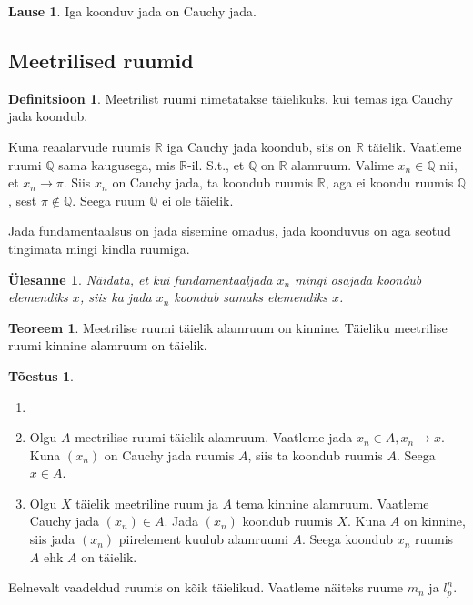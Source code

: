 \documentclass{article}[12pt]
\newcommand{\R}{\mathbb{R}}
\newcommand{\Q}{\mathbb{Q}}
\newtheorem{yl}{Ülesanne}[section]
\theoremstyle{definition}
\newtheorem{definition}{Definitsioon}[section]
\theoremstyle{definition}
\newtheorem{theorem}{Teoreem}[section]
\theoremstyle{definition}
\newtheorem{lause}{Lause}[section]
\theoremstyle{break}
\newtheorem*{toestus}{Tõestus}
\begin{document}
\begin{lause}
	Iga koonduv jada on Cauchy jada.
\end{lause}

\subsection{Meetrilised ruumid}

\begin{definition}
	Meetrilist ruumi nimetatakse täielikuks, kui temas iga Cauchy jada koondub.
\end{definition}

Kuna reaalarvude ruumis $\R$ iga Cauchy jada koondub, siis on $\R$ täielik.
Vaatleme ruumi $\Q$ sama kaugusega, mis $\R$-il.
S.t., et $\Q$ on $\R$ alamruum.
Valime $x_n\in \Q$ nii, et $x_n\rightarrow \pi$.
Siis $x_n$ on Cauchy jada, ta koondub ruumis $\R$, aga ei koondu ruumis $\Q$, sest $\pi\notin \Q$. Seega ruum $\Q$ ei ole täielik.

Jada fundamentaalsus on jada sisemine omadus, jada koonduvus on aga seotud tingimata mingi kindla ruumiga.

\begin{yl}
	Näidata, et kui fundamentaaljada $x_n$ mingi osajada koondub elemendiks $x$, siis ka jada $x_n$ koondub samaks elemendiks $x$.
\end{yl}

\begin{theorem}
	Meetrilise ruumi täielik alamruum on kinnine. 
	Täieliku meetrilise ruumi kinnine alamruum on täielik.
\end{theorem}


\begin{toestus}
	\begin{enumerate}
		\item[]
		\item Olgu $A$ meetrilise ruumi täielik alamruum.
		Vaatleme jada $x_n\in A,x_n\rightarrow x$.
		Kuna $(x_n)$ on Cauchy jada ruumis $A$, siis ta koondub ruumis $A$.
		Seega $x\in A$.
		\item Olgu $X$ täielik meetriline ruum ja $A$ tema kinnine alamruum.
		Vaatleme Cauchy jada $(x_n)\in A$.
		Jada $(x_n)$ koondub ruumis $X$.
		Kuna $A$ on kinnine, siis jada $(x_n)$ piirelement kuulub alamruumi $A$.
		Seega koondub $x_n$ ruumis $A$ ehk $A$ on täielik.
	\end{enumerate}
\end{toestus}

Eelnevalt vaadeldud ruumis on kõik täielikud.
Vaatleme näiteks ruume $m_n$ ja $l_p^n$.
\end{document}
